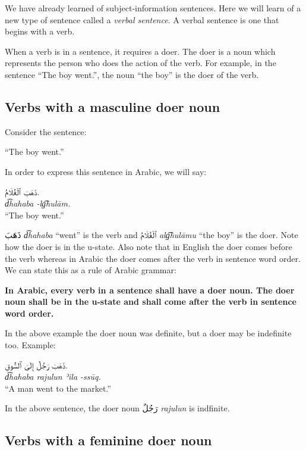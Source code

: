 \documentclass[
  10pt,
]{book}
\begin{document}
We have already learned of subject-information sentences. Here we will learn of a new type of sentence called a \emph{verbal sentence}. A verbal sentence is one that begins with a verb.

When a verb is in a sentence, it requires a doer. The doer is a noun which represents the person who does the action of the verb. For example, in the sentence \enquote{The boy went.}, the noun \enquote{the boy} is the doer of the verb.

\subsection{Verbs with a masculine doer noun}\label{verbs-with-a-masculine-doer-noun}

Consider the sentence:

\enquote{The boy went.}

In order to express this sentence in Arabic, we will say:

\foreignlanguage{arabic}{ذَهَبَ ٱلْغُلَامُ.}\\
\emph{d͡hahaba -lg͡hulām.}\\
\enquote{The boy went.}

\foreignlanguage{arabic}{ذَهَبَ} \emph{d͡hahaba} \enquote{went} is the verb and \foreignlanguage{arabic}{ٱلْغُلَامُ} \emph{alg͡hulāmu} \enquote{the boy} is the doer. Note how the doer is in the u-state. Also note that in English the doer comes before the verb whereas in Arabic the doer comes after the verb in sentence word order. We can state this as a rule of Arabic grammar:

\textbf{In Arabic, every verb in a sentence shall have a doer noun. The doer noun shall be in the u-state and shall come after the verb in sentence word order.}

In the above example the doer noun was definite, but a doer may be indefinite too. Example:

\foreignlanguage{arabic}{ذَهَبَ رَجُلٌ إِلَىَ ٱلسُّوقِ.}\\
\emph{d͡hahaba rajulun ʾila -ssūq.}\\
\enquote{A man went to the market.}

In the above sentence, the doer noun \foreignlanguage{arabic}{رَجُلٌ} \emph{rajulun} is indfinite.

\subsection{Verbs with a feminine doer noun}\label{verbs-with-a-feminine-doer-noun}
\end{document}
